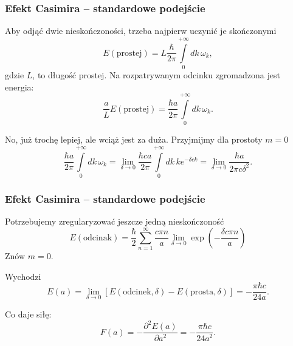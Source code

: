 \documentclass[10pt,t]{beamer}
\begin{document}
\begin{frame}
  \frametitle{Efekt Casimira -- standardowe podejście}


  Aby odjąć dwie nieskończoności, trzeba najpierw uczynić je skończonymi
  \begin{equation}
    \label{eq:O-roznych-09}
    E( \textrm{prostej} ) =
    L \frac{ \hbar }{ 2 \pi } \int\limits_{ 0 }^{ +\infty } dk \, \omega_{ k },
  \end{equation}
  gdzie $L$, to długość prostej. Na rozpatrywanym odcinku
  zgromadzona jest energia:
  \begin{equation}
    \label{eq:O-roznych-10}
    \frac{ a }{ L } E( \textrm{prostej} ) =
    \frac{ \hbar a }{ 2 \pi } \int\limits_{ 0 }^{ +\infty } dk \, \omega_{ k }.
  \end{equation}

  No, już trochę lepiej, ale wciąż jest za duża. Przyjmijmy dla
  prostoty $m = 0$
  \begin{equation}
    \label{eq:O-roznych-11}
    \frac{ \hbar a }{ 2 \pi } \int\limits_{ 0 }^{ +\infty } dk \, \omega_{ k } =
    \lim_{ \delta \rightarrow 0 } \frac{ \hbar c a }{ 2 \pi } \int\limits_{ 0 }^{ +\infty } dk \,
    k e^{ -\delta c k }
    =
    \lim_{ \delta \rightarrow 0 } \frac{ \hbar a }{ 2 \pi c \delta^{ 2 } }.
  \end{equation}

\end{frame}





\begin{frame}
  \frametitle{Efekt Casimira -- standardowe podejście}


  Potrzebujemy zregularyzować jeszcze jedną nieskończoność
  \begin{equation}
    \label{eq:O-roznych-12}
    E( \textrm{odcinak} ) =
    \frac{ \hbar }{ 2 } \sum_{ n = 1 }^{ \infty } \frac{ c \pi n }{ a } \lim_{ \delta \rightarrow 0 }
    \exp\left( -\frac{ \delta c \pi n }{ a } \right)
  \end{equation}
  Znów $m = 0$.

  Wychodzi
  \begin{equation}
    \label{eq:O-roznych-13}
    E( a ) =
    \lim_{ \delta \rightarrow 0 } [ E( \textrm{odcinek}, \delta)
    - E( \textrm{prosta}, \delta ) ]
    = -\frac{ \pi \hbar c }{ 24 a }.
  \end{equation}

  Co daje siłę:
  \begin{equation}
    \label{eq:O-roznych-14}
    F( a ) =
    -\frac{ \partial^{ 2 } E( a ) }{ \partial a^{ 2 } } =
    -\frac{ \pi \hbar c }{ 24 a^{ 2 } }.
  \end{equation}

\end{frame}
\end{document}
